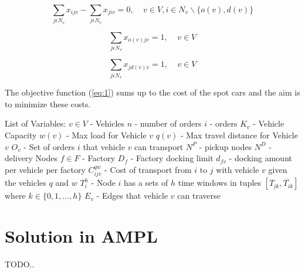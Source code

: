 \documentclass[a4paper,12pt]{article}
\begin{document}
\begin{equation} \label{eq:3}
\sum_{j\epsilon N_v}x_{ijv} - \sum_{j\epsilon N_v} x_{jiv} = 0, ~~~~~ v \in V, i\in N_v \backslash \{o(v), d(v)\} 
\end{equation}

\begin{equation} \label{eq:4}
\sum_{j\epsilon N_v} x_{o(v)jv} = 1, ~~~~~ v \in V
\end{equation}

\begin{equation} \label{eq:4}
\sum_{j\epsilon N_v} x_{j d(v)v} = 1, ~~~~~ v \in V
\end{equation}



\par
The objective function (\ref{eq:1}) sums up to the cost of the spot cars and the aim is to minimize these costs. \newline \newline


List of Variables: \newline
$v \in V$ - Vehicles \newline
$n$ - number of orders\newline
$i$ - orders\newline
$K_v$ - Vehicle Capacity \newline
$w(v)$ - Max load for Vehicle $v$ \newline
$q(v)$ - Max travel distance for Vehicle $v$ \newline
$O_v$ - Set of orders $i$ that vehicle $v$ can transport \newline
$N^P$ - pickup nodes\newline
$N^D$ - delivery Nodes\newline
$f \in F$ - Factory\newline
$D_f$ - Factory docking limit\newline
$d_{fv}$ - docking amount per vehicle per factory\newline
$C_{ijv}^{q w}$ - Cost of transport from $i$ to $j$ with vehicle $v$ given the vehicles $q$ and $w$ \newline
$T_i^h$ - Node $i$ has a sets of $h$ time windows in tuples $[ \underline{T_{ik}},  \overline{T_{ik}} ]$ where $k \in \{0,1,...,h\}$  \newline
$E_v$ - Edges that vehicle $v$ can traverse

\section{Solution in AMPL}
TODO..
\end{document}
